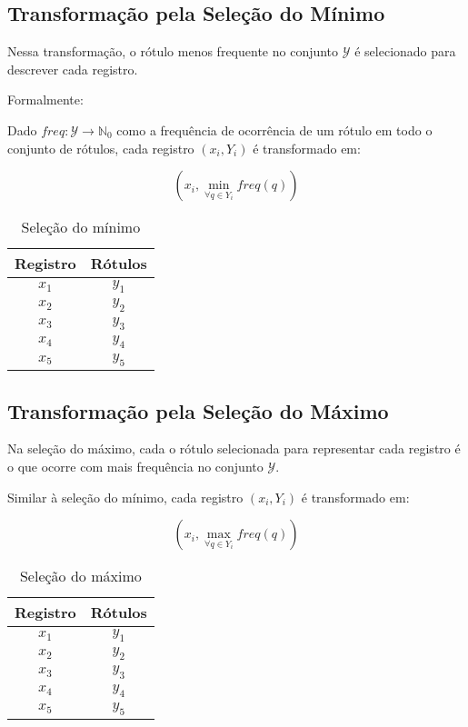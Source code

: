 \documentclass[runningheads,a4paper]{llncs}
\begin{document}
\subsection{Transformação pela Seleção do Mínimo}

Nessa transformação, o rótulo menos frequente no conjunto $\mathcal{Y}$ é selecionado para descrever cada registro.

Formalmente:

Dado $freq : \mathcal{Y} \to \mathbb{N}_0$ como a frequência de ocorrência de um rótulo em todo o conjunto de rótulos, cada registro $(x_i, Y_i)$ é transformado em:

$$(x_i, \min_{\forall q \in Y_i} freq(q))$$

\begin{table}
	\centering
	\begin{tabular}{| c | c |}
		\hline
		\textbf{Registro} & \textbf{Rótulos} \\
		\hline
		$x_1$ & $y_1$ \\
		\hline
		$x_2$ & $y_2$ \\
		\hline
		$x_3$ & $y_3$ \\
		\hline
		$x_4$ & $y_4$ \\
		\hline
		$x_5$ & $y_5$ \\
		\hline
	\end{tabular}
	\caption{Seleção do mínimo}
	\label{tab:exselmin}
\end{table}

\subsection{Transformação pela Seleção do Máximo}

Na seleção do máximo, cada o rótulo selecionada para representar cada registro é o que ocorre com mais frequência no conjunto $\mathcal{Y}$.

Similar à seleção do mínimo, cada registro $(x_i, Y_i)$ é transformado em:

$$(x_i, \max_{\forall q \in Y_i} freq(q))$$

\begin{table}
	\centering
	\begin{tabular}{| c | c |}
		\hline
		\textbf{Registro} & \textbf{Rótulos} \\
		\hline
		$x_1$ & $y_1$ \\
		\hline
		$x_2$ & $y_2$ \\
		\hline
		$x_3$ & $y_3$ \\
		\hline
		$x_4$ & $y_4$ \\
		\hline
		$x_5$ & $y_5$ \\
		\hline
	\end{tabular}
	\caption{Seleção do máximo}
	\label{tab:exselmax}
\end{table}
\end{document}

